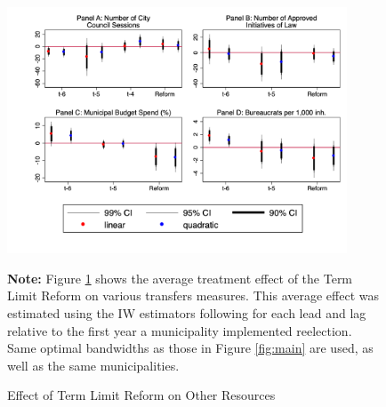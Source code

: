 \documentclass[12pt]{amsart}
\numberwithin{equation}{section}
\theoremstyle{definition}
\theoremstyle{definition}
\theoremstyle{definition}
\begin{document}
 \begin{figure}[h]   
\centering
 \caption{Effect of Term Limit Reform on Other Resources}
 \label{fig:effort}
\includegraphics[width=0.9\textwidth]{Figures_incumbency/effort_based_incumbency.png}
       \captionsetup{justification=centering}
         
 \textbf{Note:} Figure \ref{fig:effort} shows the average treatment effect of the Term Limit Reform on various transfers measures. This average effect was estimated using the IW estimators following \citet{abraham_sun_2020} for each lead and lag relative to the first year a municipality implemented reelection. Same optimal bandwidths as those in Figure \ref{fig:main} are used, as well as the same municipalities.   
\end{figure}   
\end{document}
